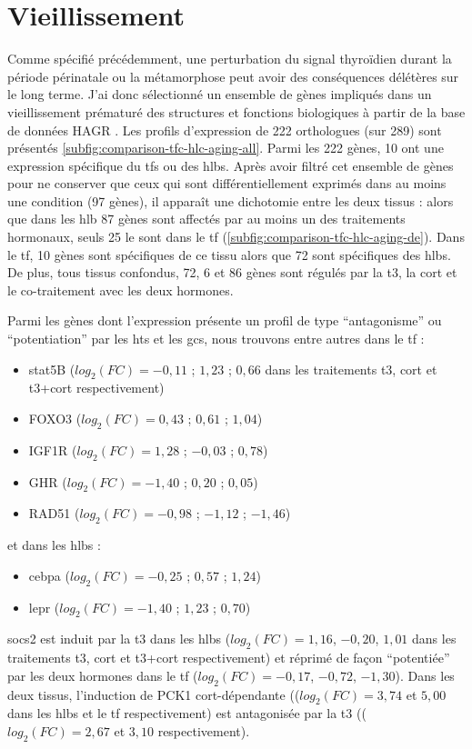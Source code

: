 \documentclass[../main.tex]{subfiles}
\begin{document}
	


\section{Vieillissement}

	Comme spécifié précédemment, une perturbation du signal thyroïdien durant la période périnatale ou la métamorphose peut avoir des conséquences délétères sur le long terme.
	J'ai donc sélectionné un ensemble de gènes impliqués dans un vieillissement prématuré des structures et fonctions biologiques à partir de la base de données HAGR \citep{DeMagalhaes2005}.
	Les profils d'expression de 222 orthologues (sur 289) sont présentés \autoref{subfig:comparison-tfc-hlc-aging-all}.
	Parmi les 222 gènes, 10 ont une expression spécifique du \glspl{tf} ou des \glspl{hlb}.
	Après avoir filtré cet ensemble de gènes pour ne conserver que ceux qui sont différentiellement exprimés dans au moins une condition (97 gènes), il apparaît une dichotomie entre les deux tissus :
	alors que dans les \gls{hlb} 87 gènes sont affectés par au moins un des traitements hormonaux, seuls 25 le sont dans le \gls{tf} (\autoref{subfig:comparison-tfc-hlc-aging-de}).
	Dans le \gls{tf}, 10 gènes sont spécifiques de ce tissu alors que 72 sont spécifiques des \glspl{hlb}.
	De plus, tous tissus confondus, 72, 6 et 86 gènes sont régulés par la \gls{t3}, la \gls{cort} et le co-traitement avec les deux hormones.
	\par
	Parmi les gènes dont l'expression présente un profil de type ``antagonisme'' ou ``potentiation'' par les \glspl{ht} et les \glspl{gc}, nous trouvons entre autres dans le \gls{tf} :
	\begin{itemize}
	\item \gls{stat5}B ($log_2(FC)=-0,11$ ; $1,23$ ; $0,66$ dans les traitements \gls{t3}, \gls{cort} et \gls{t3}+\gls{cort} respectivement)
	\item FOXO3 ($log_2(FC)=0,43$ ; $0,61$ ; $1,04$)
	\item IGF1R ($log_2(FC)=1,28$ ; $-0,03$ ; $0,78$)
	\item GHR ($log_2(FC)=-1,40$ ; $0,20$ ; $0,05$)
	\item RAD51 ($log_2(FC)=-0,98$ ; $-1,12$ ; $-1,46$)
	\end{itemize}
	et dans les \glspl{hlb} :
	\begin{itemize}
	\item \gls{cebpa} ($log_2(FC)=-0,25$ ; $0,57$ ; $1,24$)
	\item \gls{lepr} ($log_2(FC)=-1,40$ ; $1,23$ ; $0,70$)
	\end{itemize}
	\par
	\gls{socs2} est induit par la \gls{t3} dans les \glspl{hlb} ($log_2(FC)=1,16$, $-0,20$, $1,01$ dans les traitements \gls{t3}, \gls{cort} et \gls{t3}+\gls{cort} respectivement) et réprimé de façon ``potentiée'' par les deux hormones dans le \gls{tf} ($log_2(FC)=-0,17$, $-0,72$, $-1,30$).
	Dans les deux tissus, l'induction de PCK1 \gls{cort}-dépendante (($log_2(FC)=3,74$ et $5,00$ dans les \glspl{hlb} et le \gls{tf} respectivement) est antagonisée par la \gls{t3} (($log_2(FC)=2,67$ et $3,10$ respectivement).
\end{document}
